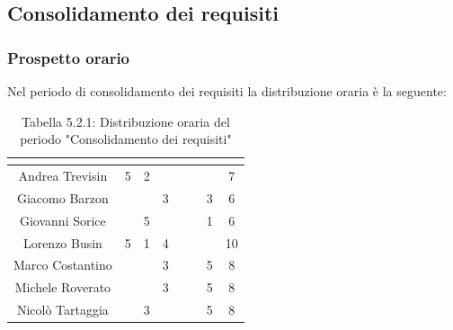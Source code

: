 \subsection{Consolidamento dei requisiti}

\subsubsection{Prospetto orario}
Nel periodo di consolidamento dei requisiti la distribuzione oraria è la seguente:

\renewcommand{\arraystretch}{1.5}
\begin{table}[H]
\begin{center}
\begin{tabular}{|c|c|c|c|c|c|c|c|}
\hline
\rowcolor{title_row}
\textbf{\color{title_text}{Nome}} & \textbf{\color{title_text}{Resp.}} & \textbf{\color{title_text}{Ammi.}} & \textbf{\color{title_text}{Analist.}} & \textbf{\color{title_text}{Progett.}} & \textbf{\color{title_text}{Program.}} & \textbf{\color{title_text}{Verific.}} & \textbf{\color{title_text}{Totale}} \\ \hline
Andrea Trevisin  & 5 & 2 & & & & & 7 \\ \hline
Giacomo Barzon   & & & 3 & & & 3 & 6 \\ \hline
Giovanni Sorice  & & 5 & & & & 1 & 6 \\ \hline
Lorenzo Busin    & 5 & 1 & 4 & & & & 10 \\ \hline
Marco Costantino & & & 3 & & & 5 & 8 \\ \hline
Michele Roverato & & & 3 & & & 5 & 8 \\ \hline
Nicolò Tartaggia & & 3 & & & & 5 & 8 \\ \hline
\end{tabular}
\caption{Tabella 5.2.1: Distribuzione oraria del periodo "Consolidamento dei requisiti"\label{}}
\end{center}
\end{table}
\renewcommand{\arraystretch}{1}

